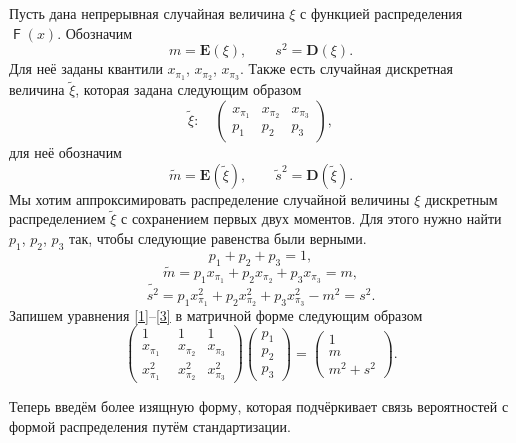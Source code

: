 \documentclass[12pt]{article}
\DeclareMathOperator{\F}{\mathsf{F}}
\begin{document}
	Пусть дана непрерывная случайная величина $\xi$ с функцией распределения $\F(x)$. Обозначим \[m = \mathbf E(\xi), \quad\quad s^{2} = \mathbf D(\xi).\]
	Для неё заданы квантили $x_{\pi_{1}}$, $x_{\pi_{2}}$, $x_{\pi_{3}}$. Также есть случайная дискретная величина $\tilde{\xi}$, которая задана следующим образом
	\[\tilde{\xi}:\quad\begin{pmatrix} 
		x_{\pi_{1}}&x_{\pi_{2}}&x_{\pi_{3}}\\ 
		p_{1} &  p_{2}  & p_{3}
	\end{pmatrix},\]
	для неё обозначим \[\tilde{m} = \mathbf E(\tilde{\xi}), \quad\quad \tilde{s}^{2} = \mathbf D(\tilde{\xi}).\]
	Мы хотим аппроксимировать распределение случайной величины $\xi$ дискретным распределением $\tilde{\xi}$ с сохранением первых двух моментов. Для этого нужно найти $p_{1}$, $p_{2}$, $p_{3}$ так, чтобы следующие равенства были верными.
	\begin{equation}
		p_{1} + p_{2} + p_{3} = 1, \label{1}
	\end{equation}
	\begin{equation}
		\tilde{m} = p_{1}x_{\pi_{1}} + p_{2}x_{\pi_{2}} + p_{3}x_{\pi_{3}} = m, \label{2}
	\end{equation}
	\begin{equation}
		\tilde{s^{2}} = p_{1} x_{\pi_{1}}^{2} + p_{2} x_{\pi_{2}}^{2} + p_{3} x_{\pi_{3}}^{2} - m^{2} = s^{2}. \label{3}
	\end{equation}
	Запишем уравнения \eqref{1}--\eqref{3} в матричной форме следующим образом
	\[\begin{pmatrix} 
		1&1&1\\ 
		x_{\pi_{1}} &  x_{\pi_{2}}  & x_{\pi_{3}} \\ 
		x_{\pi_{1}}^2~~&x_{\pi_{2}}^2  &x_{\pi_{3}}^2
	\end{pmatrix}
	\begin{pmatrix}p_{1}\\p_{2}\\ p_{3}\end{pmatrix}= \begin{pmatrix}1\\m\\m^{2}+s^{2}\end{pmatrix}.\]
	
	Теперь введём более изящную форму, которая подчёркивает связь вероятностей с формой распределения путём стандартизации.
	
\end{document}
